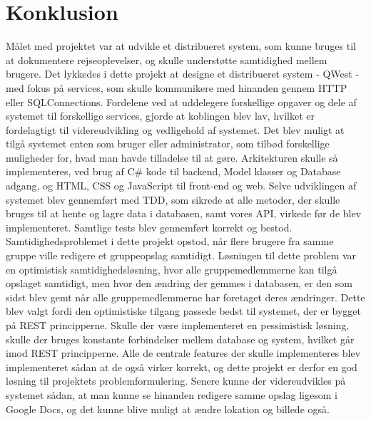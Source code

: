 \chapter{Konklusion}\label{ch:conclusion}
Målet med projektet var at udvikle et distribueret system, som kunne bruges til at dokumentere rejseoplevelser, og skulle understøtte samtidighed mellem brugere.
Det lykkedes i dette projekt at designe et distribueret system - QWest - med fokus på services, som skulle kommunikere med hinanden gennem HTTP eller SQLConnections. Fordelene ved at uddelegere forskellige opgaver og dele af systemet til forskellige services, gjorde at koblingen blev lav, hvilket er fordelagtigt til videreudvikling og vedligehold af systemet. Det blev muligt at tilgå systemet enten som bruger eller administrator, som tilbød forskellige muligheder for, hvad man havde tilladelse til at gøre. 
Arkitekturen skulle så implementeres, ved brug af C\# kode til backend, Model klasser og Database adgang, og HTML, CSS og JavaScript til front-end og web. Selve udviklingen af systemet blev gennemført med TDD, som sikrede at alle metoder, der skulle bruges til at hente og lagre data i databasen, samt vores API, virkede før de blev implementeret. Samtlige tests blev gennemført korrekt og bestod. 
Samtidighedsproblemet i dette projekt opstod, når flere brugere fra samme gruppe ville redigere et gruppeopslag samtidigt. Løsningen til dette problem var en optimistisk samtidighedsløsning, hvor alle gruppemedlemmerne kan tilgå opslaget samtidigt, men hvor den ændring der gemmes i databasen, er den som sidst blev gemt når alle gruppemedlemmerne har foretaget deres ændringer. Dette blev valgt fordi den optimistiske tilgang passede bedst til systemet, der er bygget på REST principperne. Skulle der være implementeret en pessimistisk løsning, skulle der bruges konstante forbindelser mellem database og system, hvilket går imod REST principperne.
Alle de centrale features der skulle implementeres blev implementeret sådan at de også virker korrekt, og dette projekt er derfor en god løsning til projektets problemformulering. 
Senere kunne der videreudvikles på systemet sådan, at man kunne se hinanden redigere samme opslag ligesom i Google Docs, og det kunne blive muligt at ændre lokation og billede også.